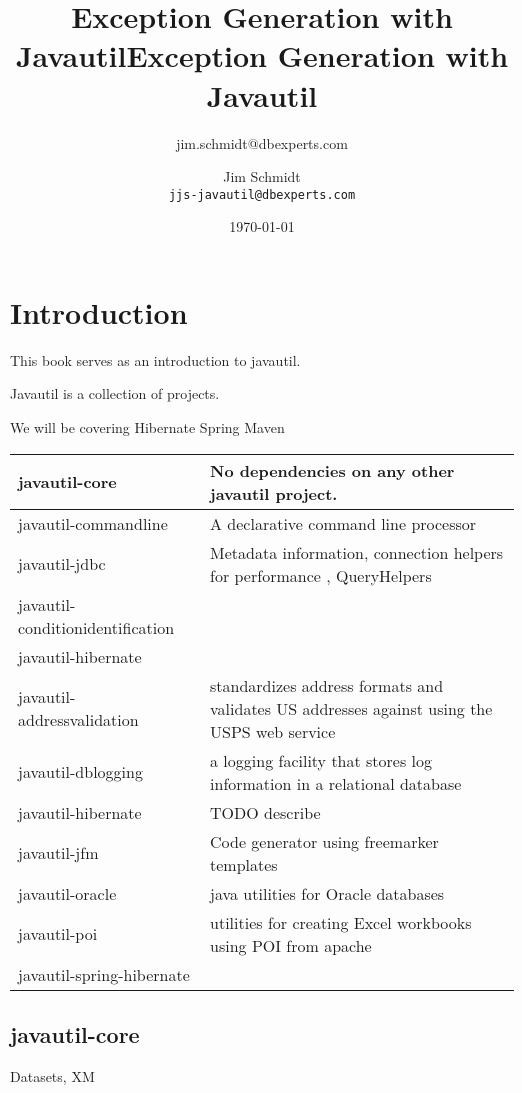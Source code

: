 \documentclass[a4paper,10pt]{book}
\title{Exception Generation with Javautil}
\author{jim.schmidt@dbexperts.com}
\begin{document}
\title{Exception Generation with Javautil}
\author{Jim Schmidt\\
  \texttt{jjs-javautil@dbexperts.com}}
\date{\today}
\maketitle
\tableofcontents
\chapter{Introduction}
This book serves as an introduction to javautil.

Javautil is a collection of projects.

We will be covering 
Hibernate
Spring 
Maven



\begin{tabular}{l | l}

javautil-core & No dependencies on any other javautil project. \\ \hline
javautil-commandline & A declarative command line processor \\ \hline
javautil-jdbc & Metadata information, connection helpers for performance , QueryHelpers \\ \hline

javautil-conditionidentification \\ \hline


javautil-hibernate & \\ \hline 
javautil-addressvalidation & standardizes address formats and validates US addresses against using the USPS web service \\ \hline 
javautil-dblogging & a logging facility that stores log information in a relational database \\ \hline
javautil-hibernate & TODO describe \\ \hline

javautil-jfm & Code generator using freemarker templates \\ \hline
javautil-oracle & java utilities for Oracle databases \\ \hline
javautil-poi & utilities for creating Excel workbooks using POI from apache \\ \hline
javautil-spring-hibernate & \\ 


\end{tabular} 

\section{javautil-core}
Datasets, XM
\end{document}
